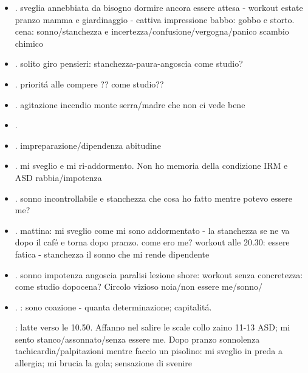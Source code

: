 \begin{itemize}
\item {}.
sveglia annebbiata da bisogno dormire ancora
essere attesa - workout estate pranzo mamma e giardinaggio - cattiva impressione babbo: gobbo e storto.
cena: sonno/stanchezza e incertezza/confusione/vergogna/panico scambio chimico

\item {}.
solito giro pensieri: stanchezza-paura-angoscia
come studio?

\item {}.
priorit\'a alle compere ??
come studio??

\item {}.
agitazione incendio monte serra/madre che non ci vede bene

\item {}.


\item {}.
impreparazione/dipendenza abitudine

\item {}.
mi sveglio e mi ri-addormento. Non ho memoria della condizione
IRM e ASD
rabbia/impotenza

\item {}.
sonno incontrollabile e stanchezza
che cosa ho fatto mentre potevo essere me?

\item {}.
mattina: mi sveglio come mi sono addormentato - la stanchezza se ne va dopo il caf\'e e torna dopo pranzo.
come ero me? workout alle 20.30: essere fatica - stanchezza
il sonno che mi rende dipendente

\item {}.
sonno impotenza
angoscia paralisi lezione shore: 
workout senza concretezza: 
come studio dopocena? Circolo vizioso noia/non essere me/sonno/

\item {}.
: sono coazione - quanta determinazione; capitalit\'a.

: latte verso le 10.50. Affanno nel salire le scale collo zaino 11-13 ASD; mi sento stanco/assonnato/senza essere me. Dopo pranzo sonnolenza tachicardia/palpitazioni mentre faccio un pisolino: mi sveglio in preda a allergia; mi brucia la gola; sensazione di svenire


\end{itemize}
